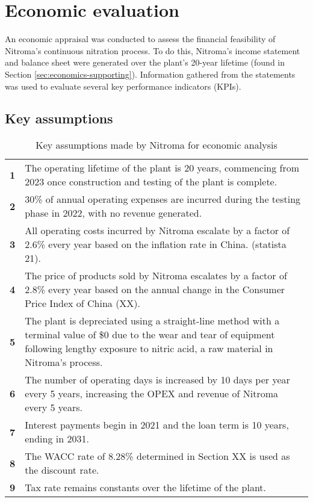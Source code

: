 \section{Economic evaluation}
An economic appraisal was conducted to assess the financial feasibility of Nitroma’s continuous nitration process. To do this, Nitroma’s income statement and balance sheet were generated over the plant’s 20-year lifetime (found in Section \ref{sec:economics-supporting}). Information gathered from the statements was used to evaluate several key performance indicators (KPIs).

\subsection{Key assumptions}

 \begin{table}[h]
    \vspace{-\intextsep}
    \centering
        \caption{Key assumptions made by Nitroma for economic analysis}
        \label{tab:assumptions-econ}
    \begin{tabular}{@{}lp{15cm}@{}}
    \toprule
   \textbf{1} & The operating lifetime of the plant is 20 years, commencing from 2023 once construction and testing of the plant is complete.   \\ 
   \textbf{2}      & 30\% of annual operating expenses are incurred during the testing phase in 2022, with no revenue generated.   \\
   \textbf{3}     & All operating costs incurred by Nitroma escalate by a factor of 2.6\% every year based on the inflation rate in China. (statista 21).   \\
   \textbf{4}                   & The price of products sold by Nitroma escalates by a factor of 2.8\% every year based on the annual change in the Consumer Price Index of China (XX).   \\
    \textbf{5}         & The plant is depreciated using a straight-line method with a terminal value of \$0 due to the wear and tear of equipment following lengthy exposure to nitric acid, a raw material in Nitroma's process.    \\ 
    \textbf{6} & The number of operating days is increased by 10 days per year every 5 years, increasing the OPEX and revenue of Nitroma every 5 years.\\
    \textbf{7} & Interest  payments begin in 2021 and the loan term is 10 years, ending in 2031. \\
    \textbf{8} & The WACC rate of 8.28\% determined in Section XX is used as the discount rate. \\
    \textbf{9} & Tax rate remains constants over the lifetime of the plant. \\
  \bottomrule
    \end{tabular}
    \end{table}

